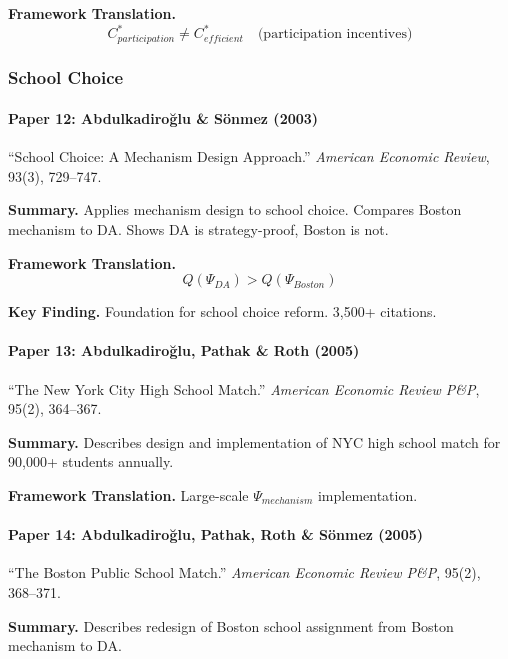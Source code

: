 \textbf{Framework Translation.}
\begin{equation}
C^*_{participation} \neq C^*_{efficient} \quad \text{(participation incentives)}
\end{equation}

\subsubsection{School Choice}

\paragraph{Paper 12: Abdulkadiroğlu \& Sönmez (2003)}

``School Choice: A Mechanism Design Approach.''
\textit{American Economic Review}, 93(3), 729--747.

\textbf{Summary.}
Applies mechanism design to school choice. Compares Boston mechanism 
to DA. Shows DA is strategy-proof, Boston is not.

\textbf{Framework Translation.}
\begin{equation}
Q(\Psi_{DA}) > Q(\Psi_{Boston})
\end{equation}

\textbf{Key Finding.}
Foundation for school choice reform. 3,500+ citations.

\paragraph{Paper 13: Abdulkadiroğlu, Pathak \& Roth (2005)}

``The New York City High School Match.''
\textit{American Economic Review P\&P}, 95(2), 364--367.

\textbf{Summary.}
Describes design and implementation of NYC high school match for 
90,000+ students annually.

\textbf{Framework Translation.}
Large-scale $\Psi_{mechanism}$ implementation.

\paragraph{Paper 14: Abdulkadiroğlu, Pathak, Roth \& Sönmez (2005)}

``The Boston Public School Match.''
\textit{American Economic Review P\&P}, 95(2), 368--371.

\textbf{Summary.}
Describes redesign of Boston school assignment from Boston mechanism to DA.

